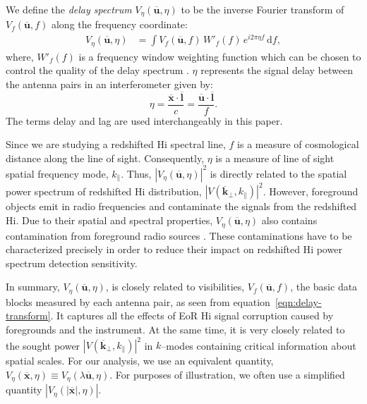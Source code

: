 \documentclass[preprint2,iop,numberedappendix]{emulateapj}
\newcommand{\dif}{\mathrm{d}}
\begin{document}
We define the {\it delay spectrum} $V_\eta(\overline{\mathbf{u}},\eta)$ to be the inverse Fourier transform of $V_f(\overline{\mathbf{u}},f)$ along the frequency coordinate:
\begin{align}\label{eqn:delay-transform}
  V_\eta(\overline{\mathbf{u}},\eta) &= \int V_f(\overline{\mathbf{u}},f)\,W'_f(f)\,e^{i2\pi\eta f}\,\dif f,
\end{align}
where, $W'_f(f)$ is a frequency window weighting function which can be chosen to control the quality of the delay spectrum \citep{thy13,ved12}. $\eta$ represents the signal delay between the antenna pairs in an interferometer given by:
\begin{equation}\label{eqn:delay}
  \eta = \frac{\overline{\mathbf{x}}\cdot\overline{\mathbf{l}}}{c} = \frac{\overline{\mathbf{u}}\cdot\overline{\mathbf{l}}}{f}.
\end{equation}
The terms delay and lag are used interchangeably in this paper.

Since we are studying a redshifted H{\sc i} spectral line, $f$ is a measure of cosmological distance along the line of sight. Consequently, $\eta$ is a measure of line of sight spatial frequency mode, $k_\parallel$. Thus, $|V_\eta(\overline{\mathbf{u}},\eta)|^2$ is directly related to the spatial power spectrum of redshifted H{\sc i} distribution, $|V(\overline{\mathbf{k}}_\perp,k_\parallel)|^2$. However, foreground objects emit in radio frequencies and contaminate the signals from the redshifted H{\sc i}. Due to their spatial and spectral properties, $V_\eta(\overline{\mathbf{u}},\eta)$ also contains contamination from foreground radio sources \citep{thy13,tro12,mor12,bow09}. These contaminations have to be characterized precisely in order to reduce their impact on redshifted H{\sc i} power spectrum detection sensitivity. 

In summary, $V_\eta(\overline{\mathbf{u}},\eta)$, is closely related to visibilities, $V_f(\overline{\mathbf{u}},f)$, the basic data blocks measured by each antenna pair, as seen from equation~\ref{eqn:delay-transform}. It captures all the effects of EoR H{\sc i} signal corruption caused by foregrounds and the instrument. At the same time, it is very closely related to the sought power $|V(\overline{\mathbf{k}}_\perp,k_\parallel)|^2$ in $k$--modes containing critical information about spatial scales. For our analysis, we use an equivalent quantity, $V_\eta(\overline{\mathbf{x}},\eta) \equiv V_\eta(\lambda\overline{\mathbf{u}},\eta)$. For purposes of illustration, we often use a simplified quantity $|V_\eta(|\overline{\mathbf{x}}|,\eta)|$.
\end{document}
